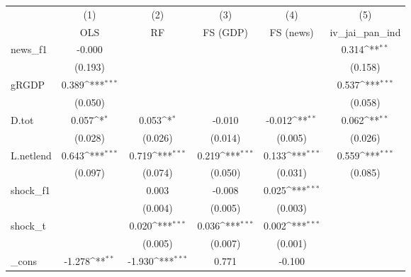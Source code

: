 {
\def\sym#1{\ifmmode^{#1}\else\(^{#1}\)\fi}
\begin{tabular}{l*{5}{c}}
\toprule
            &\multicolumn{1}{c}{(1)}&\multicolumn{1}{c}{(2)}&\multicolumn{1}{c}{(3)}&\multicolumn{1}{c}{(4)}&\multicolumn{1}{c}{(5)}\\
            &\multicolumn{1}{c}{OLS}&\multicolumn{1}{c}{RF}&\multicolumn{1}{c}{FS (GDP)}&\multicolumn{1}{c}{FS (news)}&\multicolumn{1}{c}{iv\_jai\_pan\_ind}\\
\midrule
news\_f1     &      -0.000         &                     &                     &                     &       0.314\sym{**} \\
            &     (0.193)         &                     &                     &                     &     (0.158)         \\
\addlinespace
gRGDP       &       0.389\sym{***}&                     &                     &                     &       0.537\sym{***}\\
            &     (0.050)         &                     &                     &                     &     (0.058)         \\
\addlinespace
D.tot       &       0.057\sym{*}  &       0.053\sym{*}  &      -0.010         &      -0.012\sym{**} &       0.062\sym{**} \\
            &     (0.028)         &     (0.026)         &     (0.014)         &     (0.005)         &     (0.026)         \\
\addlinespace
L.netlend   &       0.643\sym{***}&       0.719\sym{***}&       0.219\sym{***}&       0.133\sym{***}&       0.559\sym{***}\\
            &     (0.097)         &     (0.074)         &     (0.050)         &     (0.031)         &     (0.085)         \\
\addlinespace
shock\_f1    &                     &       0.003         &      -0.008         &       0.025\sym{***}&                     \\
            &                     &     (0.004)         &     (0.005)         &     (0.003)         &                     \\
\addlinespace
shock\_t     &                     &       0.020\sym{***}&       0.036\sym{***}&       0.002\sym{***}&                     \\
            &                     &     (0.005)         &     (0.007)         &     (0.001)         &                     \\
\addlinespace
\_cons      &      -1.278\sym{**} &      -1.930\sym{***}&       0.771         &      -0.100         &                     \\

\end{tabular}}
